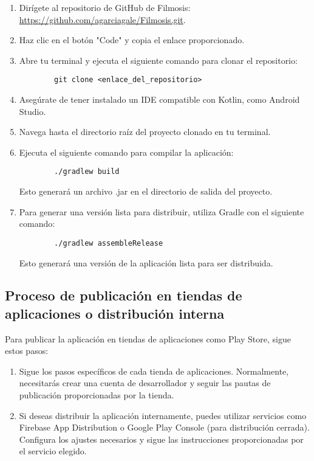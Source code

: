 \documentclass{article}
\begin{document}
\begin{enumerate}
    \item Dirígete al repositorio de GitHub de Filmosis: \url{https://github.com/agarciagale/Filmosis.git}.
    
    \item Haz clic en el botón "Code" y copia el enlace proporcionado.
    
    \item Abre tu terminal y ejecuta el siguiente comando para clonar el repositorio:
    \begin{verbatim}
        git clone <enlace_del_repositorio>
    \end{verbatim}
    
    \item Asegúrate de tener instalado un IDE compatible con Kotlin, como Android Studio.
    
    \item Navega hasta el directorio raíz del proyecto clonado en tu terminal.
    
    \item Ejecuta el siguiente comando para compilar la aplicación:
    \begin{verbatim}
        ./gradlew build
    \end{verbatim}
    Esto generará un archivo .jar en el directorio de salida del proyecto.
    
    \item Para generar una versión lista para distribuir, utiliza Gradle con el siguiente comando:
    \begin{verbatim}
        ./gradlew assembleRelease
    \end{verbatim}
    Esto generará una versión de la aplicación lista para ser distribuida.
\end{enumerate}

\subsection{Proceso de publicación en tiendas de aplicaciones o distribución interna}

Para publicar la aplicación en tiendas de aplicaciones como Play Store, sigue estos pasos:

\begin{enumerate}
    \item Sigue los pasos específicos de cada tienda de aplicaciones. Normalmente, necesitarás crear una cuenta de desarrollador y seguir las pautas de publicación proporcionadas por la tienda.
    
    \item Si deseas distribuir la aplicación internamente, puedes utilizar servicios como Firebase App Distribution o Google Play Console (para distribución cerrada). Configura los ajustes necesarios y sigue las instrucciones proporcionadas por el servicio elegido.
\end{enumerate}
\end{document}
